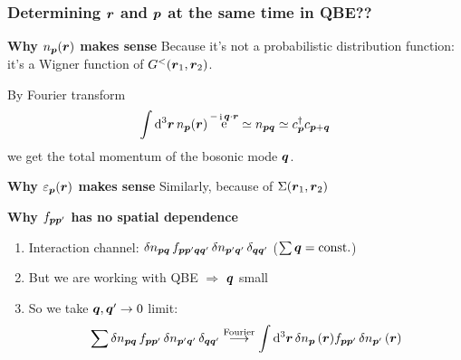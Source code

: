 \documentclass{beamer}
\DeclareMathOperator{\ee}{e}
\DeclareMathOperator{\ii}{i}
\begin{document}
\begin{frame}
\frametitle{Determining $\vb*{r}$ and $\vb*{p}$ at the same time in QBE??}

\textbf{Why $n_{\vb*{p}}(\vb*{r})$ makes sense} 
Because it's not a probabilistic distribution function:   
it's a Wigner function of $G^<(\vb*{r}_1, \vb*{r}_2)$.

By Fourier transform
\begin{equation}
    \int \dd[3]{\vb*{r}} n_{\vb*{p}}(\vb*{r}) \ee^{- \ii \vb*{q} \cdot \vb*{r}} \simeq n_{\vb*{p} \vb*{q}} 
    \simeq c^\dagger_{\vb*{p}} c_{\vb*{p} + \vb*{q}}
\end{equation}
we get the total momentum of the bosonic mode $\vb*{q}$. 

\vspace{0.5cm}

\textbf{Why $\varepsilon_{\vb*{p}}(\vb*{r})$ makes sense}  Similarly, because of $\Sigma(\vb*{r}_1, \vb*{r}_2)$

\vspace{0.5cm}

\textbf{Why $f_{\vb*{p} \vb*{p}'}$ has no spatial dependence} 
\begin{enumerate}
    \item Interaction channel: 
    $\var{n}_{\vb*{p} \vb*{q}} f_{\vb*{p} \vb*{p}' \vb*{q} \vb*{q}'} \var{n}_{\vb*{p}' \vb*{q}'} \delta_{\vb*{q} \vb*{q}'}$ ($\sum \vb*{q} = \text{const.}$) 
    \item But we are working with QBE $\Rightarrow$ $\vb*{q}$ small 
    \item So we take $\vb*{q}, \vb*{q}' \to 0$ limit: 
        \begin{equation}
            \sum \var{n}_{\vb*{p} \vb*{q}} f_{\vb*{p} \vb*{p}'} \var{n}_{\vb*{p}' \vb*{q}'} 
            \delta_{\vb*{q} \vb*{q}'}
            \stackrel{\text{Fourier}}{\longrightarrow} 
            \int \dd[3]{\vb*{r}} 
             \var{n}_{\vb*{p}}(\vb*{r}) f_{\vb*{p} \vb*{p}'} \var{n}_{\vb*{p}'}(\vb*{r})
        \end{equation}
\end{enumerate}

\end{frame}
\end{document}
